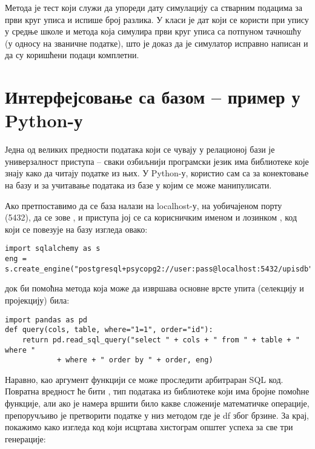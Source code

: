 Метода  је тест који служи да упореди дату симулацију са стварним подацима за први круг уписа и испише број разлика. У класи  је дат  који се користи при упису у средње школе и  метода која симулира први круг уписа са потпуном тачношћу (у односу на званичне податке), што је доказ да је симулатор исправно написан и да су коришћени подаци комплетни.


\section{Интерфејсовање са базом -- пример у Python-у}

Једна од великих предности података који се чувају у релационој бази је универзалност приступа -- сваки озбиљнији програмски језик има библиотеке које знају како да читају податке из њих. У Python-у, користио сам  са  за конектовање на базу и  за учитавање података из базе у  којим се може манипулисати.

Ако претпоставимо да се база налази на localhost-у, на уобичајеном порту (5432), да се зове , и приступа јој се са корисничким именом  и лозинком , код који се повезује на базу изгледа овако:
\begin{verbatim}
import sqlalchemy as s
eng = s.create_engine("postgresql+psycopg2://user:pass@localhost:5432/upisdb")
\end{verbatim}

док би помоћна метода која може да извршава основне врсте упита (селекцију и пројекцију) била:

\begin{verbatim}
import pandas as pd
def query(cols, table, where="1=1", order="id"):
    return pd.read_sql_query("select " + cols + " from " + table + " where " 
            + where + " order by " + order, eng)
\end{verbatim}

Наравно, као аргумент  функцији се може проследити арбитраран SQL код. Повратна вредност ће бити , тип података из  библиотеке који има бројне помоћне функције, али ако је намера вршити било какве сложеније математичке операције, препоручљиво је претворити податке у  низ методом  где је df  због брзине. За крај, покажимо како изгледа код који исцртава хистограм општег успеха за све три генерације:

